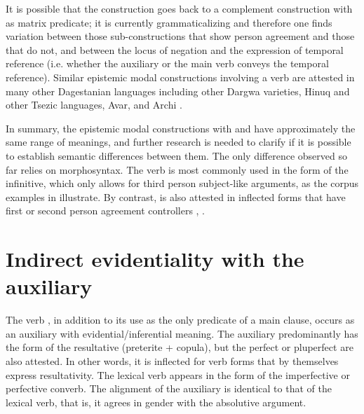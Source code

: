 It is possible that the construction goes back to a complement construction with  as matrix predicate; it is currently grammaticalizing and therefore one finds variation between those sub-constructions that show person agreement and those that do not, and between the locus of negation and the expression of temporal reference (i.e. whether the auxiliary or the main verb conveys the temporal reference). Similar epistemic modal constructions involving a verb  are attested in many other Dagestanian languages including other Dargwa varieties, Hinuq and other Tsezic languages, Avar, and Archi \citep{Forker2018a, Forker2018b}.

In summary, the epistemic modal constructions with   and   have approximately the same range of meanings, and further research is needed to clarify if it is possible to establish semantic differences between them. The only difference observed so far relies on morphosyntax. The verb  is most commonly used in the form of the infinitive, which only allows for third person subject-like arguments, as the corpus examples in  illustrate. By contrast,  is also attested in inflected forms that have first or second person agreement controllers , .



\section{Indirect evidentiality with the auxiliary \protect{} \protect{}}
\label{sec:Indirect evidentiality with the auxiliary b-uz be, be at, stay, remain}

The verb  , in addition to its use as the only predicate of a main clause, occurs as an auxiliary with evidential\slash inferential meaning. The auxiliary predominantly has the form of the resultative (preterite + copula), but the perfect or pluperfect are also attested. In other words, it is inflected for verb forms that by themselves express resultativity. The lexical verb appears in the form of the imperfective or perfective converb. The alignment of the auxiliary is identical to that of the lexical verb, that is, it agrees in gender with the absolutive argument.

